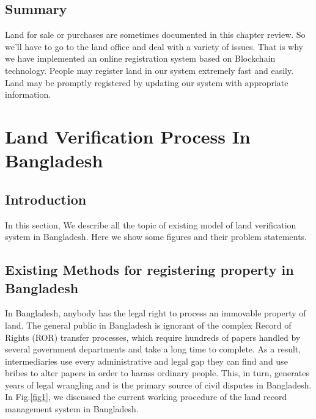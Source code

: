 \documentclass[12pt]{ucthesis}
\begin{document}
\section{Summary}
\label{backgroundsummary}
    
    Land for sale or  purchases are sometimes documented in this chapter review. So we'll have to go to the land office and deal with a variety of issues. That is why we have implemented an online registration system based on Blockchain technology. People may register land in our system extremely fast and easily. Land may be promptly registered by updating our system with appropriate information.
    


\chapter{Land Verification Process In Bangladesh}
\label{existingmodel}



\section{Introduction}
\label{proposedmodelintroduction}
    
    In this section, We describe all the topic of existing model of land verification system in Bangladesh. Here we show some figures and their problem statements.    
    

\section{ Existing Methods for registering property in Bangladesh}
\label{registeringproperty}

    In Bangladesh, anybody has the legal right to process an immovable property of land. The general public in Bangladesh is ignorant of the complex Record of Rights (ROR) transfer processes, which require hundreds of papers handled by several government departments and take a long time to complete. As a result, intermediaries use every administrative and legal gap they can find and use bribes to alter papers in order to harass ordinary people. This, in turn, generates years of legal wrangling and is the primary source of civil disputes in Bangladesh\cite{rf3}. In Fig.\ref{fig1}, we discussed the current working procedure of the land record management system in Bangladesh.
    
\end{document}
